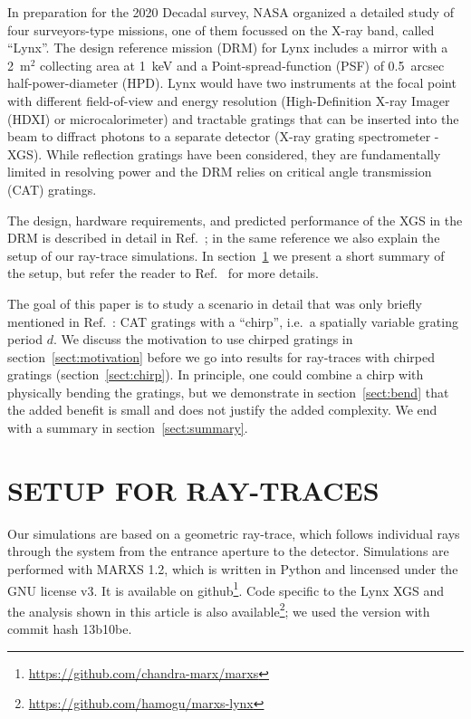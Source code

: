 \documentclass[]{spie}  %
\begin{document}
In preparation for the 2020 Decadal survey, NASA organized a detailed study of four surveyors-type missions, one of them focussed on the X-ray band, called ``Lynx''\cite{gaskin}. The design
reference mission (DRM) for Lynx includes a mirror with a 2~m$^2$ collecting area at
1~keV and a Point-spread-function (PSF) of 0.5~arcsec half-power-diameter
(HPD). Lynx would have two instruments at the focal point with different field-of-view and energy resolution (High-Definition X-ray Imager
(HDXI)\cite{HDXI} or microcalorimeter\cite{MICROCAL}) and tractable gratings that can be inserted into the beam to diffract photons to a separate detector (X-ray grating spectrometer - XGS). While reflection gratings have been considered\cite{OPXGS}, they are fundamentally limited in resolving power\cite{2020ApJ...897...92D} and the DRM relies on critical angle transmission (CAT) gratings.

The design, hardware requirements, and predicted performance of the XGS in the DRM is described in detail in Ref.~; in the same reference we also explain the setup of our ray-trace simulations. In section~\ref{sect:raytrace} we present a short summary of the setup, but refer the reader to Ref.~ for more details. 

The goal of this paper is to study a scenario in detail that was only briefly mentioned in Ref.~: CAT gratings with a ``chirp'', i.e.\ a spatially variable grating period $d$. We discuss the motivation to use chirped gratings in section~\ref{sect:motivation} before we go into results for ray-traces with chirped gratings (section~\ref{sect:chirp}). In principle, one could combine a chirp with physically bending the gratings, but we demonstrate in section~\ref{sect:bend} that the added benefit is small and does not justify the added complexity. We end with a summary in section~\ref{sect:summary}.

\section{SETUP FOR RAY-TRACES}
\label{sect:raytrace}
Our simulations are based on a geometric ray-trace, which follows
individual rays through the system from the entrance aperture to the
detector. Simulations are performed with MARXS
1.2\cite{marxs,marxs1.2}, which is written in Python and lincensed
under the GNU license v3. It is available on
github\footnote{\url{https://github.com/chandra-marx/marxs}}. Code specific to the Lynx XGS and the analysis shown in this article is also available\footnote{\url{https://github.com/hamogu/marxs-lynx}}; we
used the version with commit hash 13b10be. 
\end{document}
